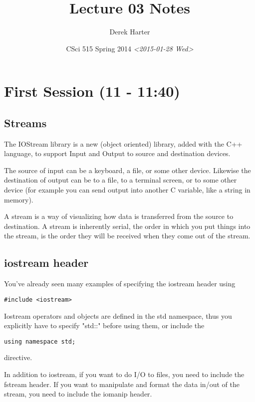 \documentclass[11pt]{article}
\author{Derek Harter}
\date{CSci 515 Spring 2014 \textit{<2015-01-28 Wed>}}
\title{Lecture 03 Notes}
\begin{document}
\maketitle

\section{First Session (11 - 11:40)}
\label{sec-1}
\subsection{Streams}
\label{sec-1-1}
The IOStream library is a new (object oriented) library, added with the C++
language, to support Input and Output to source and destination devices.

The source of input can be a keyboard, a file, or some other device.  Likewise
the destination of output can be to a file, to a terminal screen, or to some
other device (for example you can send output into another C variable, like
a string in memory).

A stream is a way of visualizing how data is transferred from the source to 
destination.  A stream is inherently serial, the order in which you put things
into the stream, is the order they will be received when they come out of the
stream.
\subsection{iostream header}
\label{sec-1-2}
You've already seen many examples of specifying the iostream header using

\begin{verbatim}
#include <iostream>
\end{verbatim}

Iostream operators and objects are defined in the std namespace, thus you
explicitly have to specify "std::" before using them, or include the

\begin{verbatim}
using namespace std;
\end{verbatim}

directive.

In addition to iostream, if you want to do I/O to files, you need to include
the fstream header.  If you want to manipulate and format the data in/out of
the stream, you need to include the iomanip header.
\end{document}
